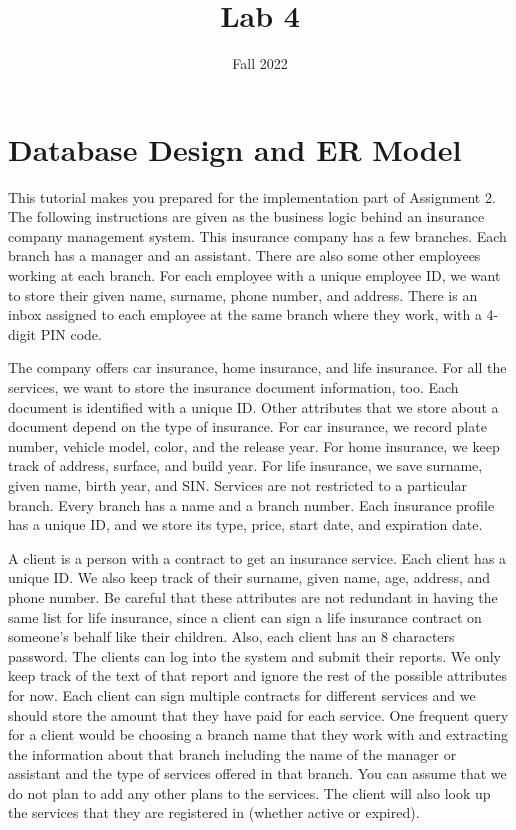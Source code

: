 \documentclass{homework}
\author{}
\date{Fall 2022}
\title{Lab 4}
\begin{document}
 \maketitle

\section{Database Design and ER Model}

This tutorial makes you prepared for the implementation part of Assignment 2. The following instructions are given as the business logic behind an insurance company management system.
This insurance company has a few branches. Each branch has a manager and an assistant. There are also some other employees working at each branch. For each employee with a unique employee ID, we want to store their given name, surname, phone number, and address. There is an inbox assigned to each employee at the same branch where they work, with a 4-digit PIN code.

The company offers car insurance, home insurance, and life insurance. For all the services, we want to store the insurance document information, too. Each document is identified with a unique ID. Other attributes that we store about a document depend on the type of insurance. For car insurance, we record plate number, vehicle model, color, and the release year. For home insurance, we keep track of address, surface, and build year. For life insurance, we save surname, given name, birth year, and SIN. Services are not restricted to a particular branch. Every branch has a name and a branch number. Each insurance profile has a unique ID, and we store its type, price, start date, and expiration date.

A client is a person with a contract to get an insurance service. Each client has a unique ID. We also keep track of their surname, given name, age, address, and phone number. Be careful that these attributes are not redundant in having the same list for life insurance, since a client can sign a life insurance contract on someone's behalf like their children. Also, each client has an 8 characters password. The clients can log into the system and submit their reports. We only keep track of the text of that report and ignore the rest of the possible attributes for now. Each client can sign multiple contracts for different services and we should store the amount that they have paid for each service. One frequent query for a client would be choosing a branch name that they work with and extracting the information about that branch including the name of the manager or assistant and the type of services offered in that branch. You can assume that we do not plan to add any other plans to the services. The client will also look up the services that they are registered in (whether active or expired). 
\end{document}
